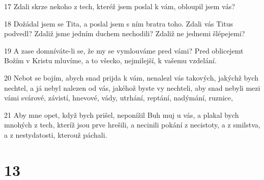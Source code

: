 \par 17 Zdali skrze nekoho z tech, kteréž jsem poslal k vám, obloupil jsem vás?
\par 18 Dožádal jsem se Tita, a poslal jsem s ním bratra toho. Zdali vás Titus podvedl? Zdaliž jsme jedním duchem nechodili? Zdaliž ne jednemi šlépejemi?
\par 19 A zase domníváte-li se, že my se vymlouváme pred vámi? Pred oblicejemt Božím v Kristu mluvíme, a to všecko, nejmilejší, k vašemu vzdelání.
\par 20 Nebot se bojím, abych snad prijda k vám, nenalezl vás takových, jakýchž bych nechtel, a já nebyl nalezen od vás, jakéhož byste vy nechteli, aby snad nebyli mezi vámi svárové, závistí, hnevové, vády, utrhání, reptání, nadýmání, ruznice,
\par 21 Aby mne opet, když bych prišel, neponížil Buh muj u vás, a plakal bych mnohých z tech, kteríž jsou prve hrešili, a necinili pokání z necistoty, a z smilstva, a z nestydatosti, kterouž páchali.

\chapter{13}

